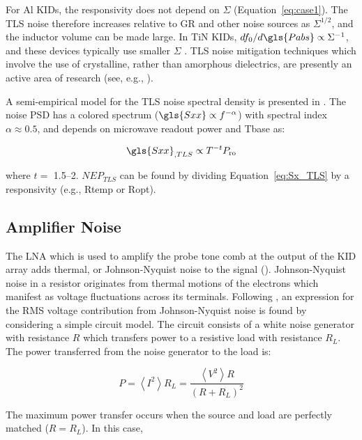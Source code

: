 For Al KIDs, the responsivity does not depend on $\Sigma$ (Equation~\ref{eq:case1}). The TLS noise therefore increases relative to GR and other noise sources as $\Sigma^{1/2}$, and the inductor volume can be made large. In TiN KIDs, $df_{0}/d\gls{Pabs} \propto \Sigma^{-1}$, and these devices typically use smaller $\Sigma$ \citep{mauskopf2018transition}. TLS noise mitigation techniques which involve the use of crystalline, rather than amorphous dielectrics, are presently an active area of research (see, e.g., \citet{weber2011single}).

A semi-empirical model for the TLS noise spectral density is presented in \citet{gao2008semiempirical}. The noise PSD has a colored spectrum ($\gls{Sxx} \propto f^{-\alpha}$) with spectral index $\alpha \approx 0.5$, and depends on microwave readout power and \gls{Tbase} as:

\begin{equation}\label{eq:Sx_TLS}
  \gls{Sxx}_{,TLS} \propto T^{-t}P_{\mathrm{ro}}
\end{equation}

where $t =$ 1.5--2. $NEP_{TLS}$ can be found by dividing Equation~\ref{eq:Sx_TLS} by a responsivity (e.g., \gls{Rtemp} or \gls{Ropt}).

\subsection{Amplifier Noise}\label{ssec:amp noise}

The LNA which is used to amplify the probe tone comb at the output of the KID array adds thermal, or Johnson-Nyquist noise to the signal (\citet{johnson,nyquist1928thermal}). Johnson-Nyquist noise in a resistor originates from thermal motions of the electrons which manifest as voltage fluctuations across its terminals. Following \citet{kittel1998thermal}, an expression for the RMS voltage contribution from Johnson-Nyquist noise is found by considering a simple circuit model. The circuit consists of a white noise generator with resistance $R$ which transfers power to a resistive load with resistance $R_{L}$. The power transferred from the noise generator to the load is:

\begin{equation}
  P = \left<I^{2}\right>R_{L} = \frac{\left<V^{2}\right>R}{(R + R_{L})^{2}}
\end{equation}

The maximum power transfer occurs when the source and load are perfectly matched ($R = R_{L}$). In this case,

